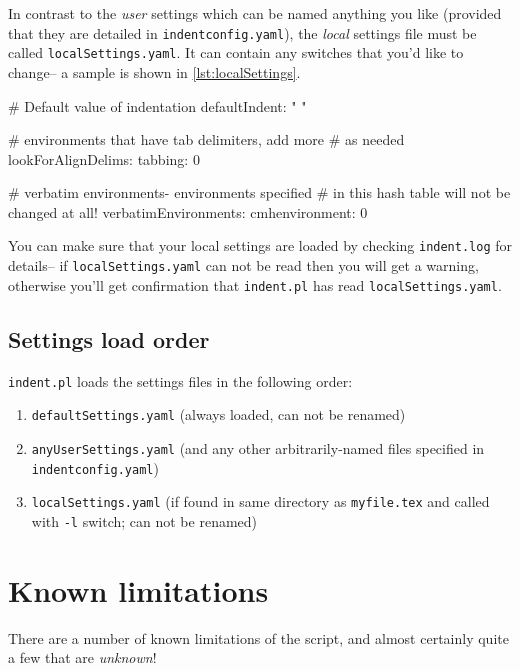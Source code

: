  	In contrast to the \emph{user} settings which can be named anything you like (provided that
 	they are detailed in \lstinline!indentconfig.yaml!), the \emph{local} settings file
 	must be called \lstinline!localSettings.yaml!. It can contain any switches that you'd
 	like to change-- a sample is shown in \cref{lst:localSettings}.
 	 	 	 	 	
 	\begin{yaml}[caption={\lstinline!localSettings.yaml! (example)},label={lst:localSettings}]
# Default value of indentation
defaultIndent: " "

# environments that have tab delimiters, add more 
# as needed
lookForAlignDelims:
   tabbing: 0

#  verbatim environments- environments specified 
#  in this hash table will not be changed at all!
verbatimEnvironments:
    cmhenvironment: 0
 	\end{yaml}
 	 	 	 	 	
 	You can make sure that your local settings are loaded by checking \lstinline!indent.log!
 	for details-- if \lstinline!localSettings.yaml! can not be read then you will
 	get a warning, otherwise you'll get confirmation that 
 	\lstinline!indent.pl! has read \lstinline!localSettings.yaml!.
 	 	 	 	 	
 \subsection{Settings load order}
 	\lstinline!indent.pl! loads the settings files in the following order:
 	\begin{enumerate}
 		\item \lstinline!defaultSettings.yaml! (always loaded, can not be renamed)
 		\item \lstinline!anyUserSettings.yaml! (and any other arbitrarily-named files specified in \lstinline!indentconfig.yaml!)
 		\item \lstinline!localSettings.yaml! (if found in same directory as \lstinline!myfile.tex! and called
 		with \lstinline!-l! switch; can not be renamed)
 	\end{enumerate}
 	 	 	 	 	
\section{Known limitations}\label{sec:knownlimitations}
 There are a number of known limitations of the script, and almost certainly quite a
 few that are \emph{unknown}!
      
